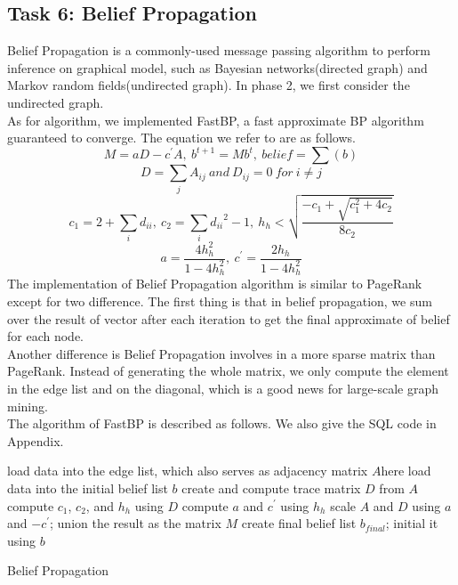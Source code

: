 \subsection{Task 6: Belief Propagation}
Belief Propagation is a commonly-used message passing algorithm to perform inference on graphical model, such as Bayesian networks(directed graph) and Markov random fields(undirected graph). In phase 2, we first consider the undirected graph.\\
As for algorithm, we implemented FastBP\cite{koutra2011unifying}, a fast approximate BP algorithm guaranteed to converge. The equation we refer to are as follows.
\[M=aD − c^{′}A,\ b^{t+1}=Mb^t,\ belief=\sum(b)\]
\[D=\sum_j{A_{ij}}\ and\ D_{ij}=0\ for\ i \ne j\]
\[c_1 = 2+\sum_i{d_{ii}},\ c_2=\sum_i{d_{ii}}^2-1,\ h_h < \sqrt{\frac{-c_1+\sqrt{c_1^2+4c_2}}{8c_2}}\]
\[a=\frac{4h_h^2}{1-4h_h^2},\ c^{'}=\frac{2h_h}{1-4h_h^2}\]
The implementation of Belief Propagation algorithm is similar to PageRank except for two difference. The first thing is that in belief propagation, we sum over the result of vector after each iteration to get the final approximate of belief for each node. \\
Another difference is Belief Propagation involves in a more sparse matrix than PageRank. Instead of generating the whole matrix, we only compute the element in the edge list and on the diagonal, which is a good news for large-scale graph mining. \\
The algorithm of FastBP is described as follows. We also give the SQL code in Appendix.
\begin{algorithm}[H]
	\SetAlgoLined
	load data into the edge list, which also serves as adjacency matrix $A$here\;
	load data into the initial belief list $b$\;
	create and compute trace matrix $D$ from $A$\;
	compute $c_1$, $c_2$, and $h_h$ using $D$\;
	compute $a$ and $c^{'}$ using $h_h$ \;
	scale $A$ and $D$ using $a$ and $-c^{'}$; union the result as the matrix $M$\;
	create final belief list $b_{final}$; initial it using $b$\;
	\caption{Belief Propagation}
	\label{bp}
\end{algorithm}
